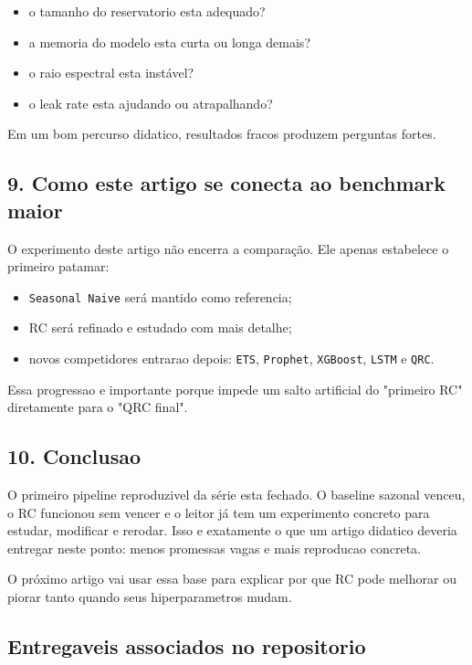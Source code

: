 \documentclass[12pt]{article}
\providecommand{\tightlist}{%
          \setlength{\itemsep}{0pt}\setlength{\parskip}{0pt}}
\begin{document}
\begin{itemize}
\tightlist
\item
  o tamanho do reservatorio esta adequado?
\item
  a memoria do modelo esta curta ou longa demais?
\item
  o raio espectral esta instável?
\item
  o leak rate esta ajudando ou atrapalhando?
\end{itemize}

Em um bom percurso didatico, resultados fracos produzem perguntas fortes.

\subsection{9. Como este artigo se conecta ao benchmark maior}\label{9-como-este-artigo-se-conecta-ao-benchmark-maior}

O experimento deste artigo não encerra a comparação. Ele apenas estabelece o primeiro patamar:

\begin{itemize}
\tightlist
\item
  \texttt{Seasonal\ Naive} será mantido como referencia;
\item
  RC será refinado e estudado com mais detalhe;
\item
  novos competidores entrarao depois: \texttt{ETS}, \texttt{Prophet}, \texttt{XGBoost}, \texttt{LSTM} e \texttt{QRC}.
\end{itemize}

Essa progressao e importante porque impede um salto artificial do "primeiro RC" diretamente para o "QRC final".

\subsection{10. Conclusao}\label{10-conclusao}

O primeiro pipeline reproduzivel da série esta fechado. O baseline sazonal venceu, o RC funcionou sem vencer e o leitor já tem um experimento concreto para estudar, modificar e rerodar. Isso e exatamente o que um artigo didatico deveria entregar neste ponto: menos promessas vagas e mais reproducao concreta.

O próximo artigo vai usar essa base para explicar por que RC pode melhorar ou piorar tanto quando seus hiperparametros mudam.

\subsection{Entregaveis associados no repositorio}\label{entregaveis-associados-no-repositorio}
\end{document}
